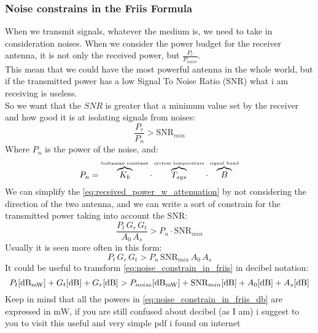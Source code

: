 \subsubsection*{Noise constrains in the Friis Formula}
When we transmit signals, whatever the medium is, we need to take in consideration noises. When we consider the power budget for the receiver antenna, it is not only the received power, but $\frac{P_r}{P_{noise}}$.\\
This mean that we could have the most powerful antenna in the whole world, but if the transmitted power has a low Signal To Noise Ratio (SNR) what i am receiving is useless.\\
So we want that the $SNR$ is greater that a minimum value set by the receiver and how good it is at isolating signals from noises:
\begin{equation}
    \frac{P_r}{P_{n}}>\text{SNR}_{min}
\end{equation}
Where $P_n$ is the power of the noise, and:
\begin{equation}
    P_n=\overbrace{K_b}^{\text{\tiny{boltzman constant}}}\cdot \overbrace{T_{sys}}^{\text{\tiny{system temperature}}}\cdot\overbrace{B}^{\text{\tiny{signal band}}}
\end{equation}
We can simplify the \cref{eq:received_power_w_attenuation} by not considering the direction of the two antenna, and we can write a sort of constrain for the transmitted power taking into account the SNR:
\begin{equation}
    \frac{P_t\,G_r\,G_t}{A_0\,A_s}>P_{n}\cdot\text{SNR}_{min}
\end{equation}
Usually it is seen more often in this form:
\begin{equation}\label{eq:noise_constrain_in_friis}
    P_t\,G_r\,G_t>P_{n} \, \text{SNR}_{min} \,A_0\,A_s
\end{equation}
It could be useful to transform \cref{eq:noise_constrain_in_friis} in decibel notation:
\begin{equation}\label{eq:noise_constrain_in_friis_db}
    P_t[\si{\deci\bel_{\milli\watt}}]+G_t[\si{\deci\bel}]+G_r[\si{\deci\bel}]>P_{noise}[\si{\deci\bel_{\milli\watt}}]+\text{SNR}_{min}[\si{\deci\bel}]+A_0[\si{\deci\bel}]+A_s[\si{\deci\bel}]
\end{equation}
Keep in mind that all the powers in \cref{eq:noise_constrain_in_friis_db} are expressed in $\si{\milli \watt}$, if you are still confused about decibel (as I am) i suggest to you to visit this useful and very simple pdf i found on internet\cite{Appunti_decibel}
